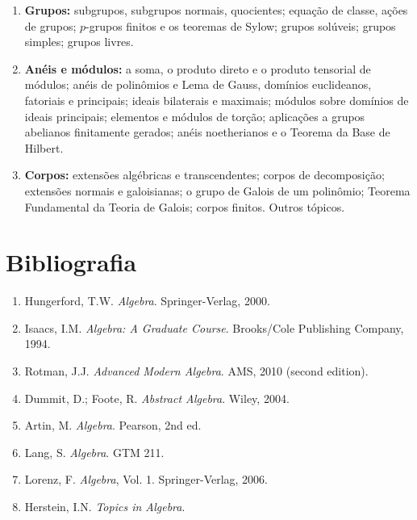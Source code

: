 \begin{enumerate}
    \item \textbf{Grupos:} subgrupos, subgrupos normais, quocientes; equação de classe, ações de grupos; $p$-grupos finitos e os teoremas de Sylow; grupos solúveis; grupos simples; grupos livres.

    \item \textbf{Anéis e módulos:} a soma, o produto direto e o produto tensorial de módulos; anéis de polinômios e Lema de Gauss, domínios euclideanos, fatoriais e principais; ideais bilaterais e maximais; módulos sobre domínios de ideais principais; elementos e módulos de torção; aplicações a grupos abelianos finitamente gerados; anéis noetherianos e o Teorema da Base de Hilbert.

    \item \textbf{Corpos:} extensões algébricas e transcendentes; corpos de decomposição; extensões normais e galoisianas; o grupo de Galois de um polinômio; Teorema Fundamental da Teoria de Galois; corpos finitos. Outros tópicos.
\end{enumerate}

\section*{Bibliografia}

\begin{enumerate}
    \item Hungerford, T.W. \textit{Algebra}. Springer-Verlag, 2000.
    \item Isaacs, I.M. \textit{Algebra: A Graduate Course}. Brooks/Cole Publishing Company, 1994.
    \item Rotman, J.J. \textit{Advanced Modern Algebra}. AMS, 2010 (second edition).
    \item Dummit, D.; Foote, R. \textit{Abstract Algebra}. Wiley, 2004.
    \item Artin, M. \textit{Algebra}. Pearson, 2nd ed.
    \item Lang, S. \textit{Algebra}. GTM 211.
    \item Lorenz, F. \textit{Algebra}, Vol. 1. Springer-Verlag, 2006.
    \item Herstein, I.N. \textit{Topics in Algebra}.
\end{enumerate}
